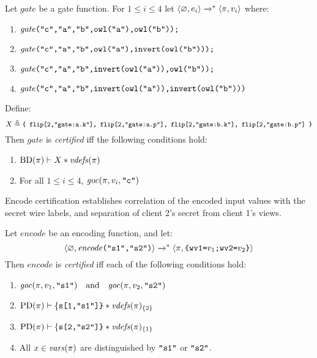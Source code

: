 \begin{definition}
  \label{definition-ygcgate-certification}
  Let $\mathit{gate}$ be a gate function.
  For $1 \le i \le 4$  let
  $
  \langle \varnothing,e_i \rangle\xrightarrow{}^{*}\langle \pi,v_i \rangle
  $
  where:
  \begin{enumerate}
    \item $\mathit{gate}\texttt{("c","a","b",owl("a"),owl("b"));}$
    \item $\mathit{gate}\texttt{("c","a","b",owl("a"),invert(owl("b")));}$
    \item $\mathit{gate}\texttt{("c","a","b",invert(owl("a")),owl("b"));}$
    \item $\mathit{gate}\texttt{("c","a","b",invert(owl("a")),invert(owl("b")))}$
  \end{enumerate}
  Define:
  $${\small X \triangleq \texttt{\{ flip[2,"gate:a.k"], flip[2,"gate:a.p"], flip[2,"gate:b.k"], flip[2,"gate:b.p"] \}}}$$
  Then $\mathit{gate}$ is \emph{certified} iff the following conditions hold:
  \begin{enumerate}[\hspace{5mm}i.]
  \item $\mathrm{BD}(\pi) \vdash X * \mathit{vdefs}(\pi)$
  \item For all $1 \le i \le 4$, $\mathit{goc}(\pi,v_i,\texttt{"c"})$
  \end{enumerate}
\end{definition}
Encode certification establishes correlation of the encoded input values with
the secret wire labels, and separation of client 2's secret from client 1's views. 
\begin{definition}
  \label{definition-ygcencode-certification}
  Let $\mathit{encode}$ be an encoding function, and let:
  $$
  \langle \varnothing,\mathit{encode}\texttt{("s1","s2")} \rangle \xrightarrow{}^{*}
  \langle \pi,\texttt{\{wv1=}v_1\texttt{;wv2=}v_2\texttt{\}} \rangle
  $$
  Then $\mathit{encode}$ is \emph{certified} iff each of the following conditions hold:
  \begin{enumerate}[\hspace{5mm}i.]
  \item $\mathit{goc}(\pi,v_1,\texttt{"s1"}) \quad \text{and} \quad \mathit{goc}(\pi,v_2,\texttt{"s2"})$
  \item $\mathrm{PD}(\pi) \vdash \{\texttt{s[1,"s1"]\}} * \mathit{vdefs}(\pi)_{\{2\}}$
  \item $\mathrm{PD}(\pi) \vdash \{\texttt{s[2,"s2"]\}} * \mathit{vdefs}(\pi)_{\{1\}}$    
  \item All $x \in \mathit{vars}(\pi)$ are distinguished by $\texttt{"s1"}$ or $\texttt{"s2"}$. 
  \end{enumerate}
\end{definition}
